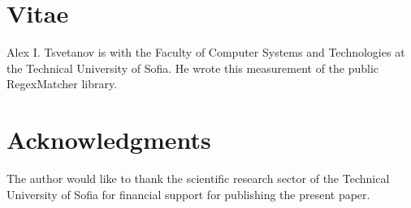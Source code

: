 \documentclass[preprint,12pt,authoryear]{elsarticle}
\begin{document}
\section*{Vitae}

Alex I. Tsvetanov is with the Faculty of Computer Systems and Technologies at the Technical University of Sofia.
He wrote this measurement of the public RegexMatcher library.

\section*{Acknowledgments}

The author would like to thank the scientific research sector of the Technical University of Sofia for financial support for publishing the present paper.



\end{document}
